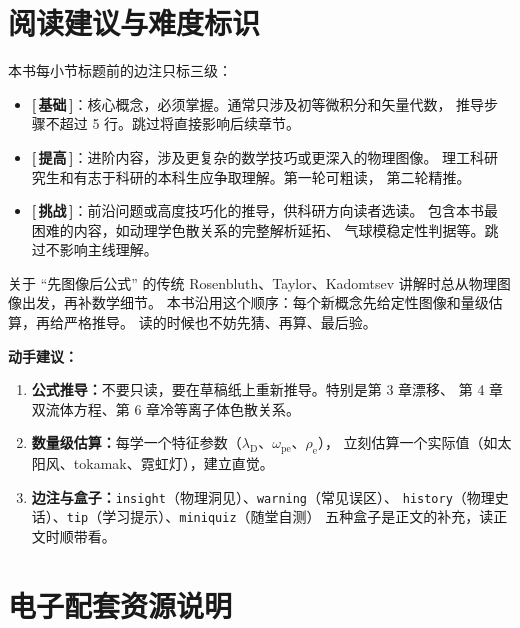 \documentclass[12pt,a4paper,openany,oneside]{book}
\newcommand{\ee}{\mathrm{e}}
\begin{document}
\section*{阅读建议与难度标识}
{}

本书每小节标题前的边注只标三级：

\begin{itemize}
\item \textbf{[\,基础\,]}：核心概念，必须掌握。通常只涉及初等微积分和矢量代数，
推导步骤不超过 5 行。跳过将直接影响后续章节。

\item \textbf{[\,提高\,]}：进阶内容，涉及更复杂的数学技巧或更深入的物理图像。
理工科研究生和有志于科研的本科生应争取理解。第一轮可粗读，
第二轮精推。

\item \textbf{[\,挑战\,]}：前沿问题或高度技巧化的推导，供科研方向读者选读。
包含本书最困难的内容，如动理学色散关系的完整解析延拓、
气球模稳定性判据等。跳过不影响主线理解。
\end{itemize}

\begin{history}{关于 ``先图像后公式'' 的传统}{}{}
Rosenbluth、Taylor、Kadomtsev 讲解时总从物理图像出发，再补数学细节。
本书沿用这个顺序：每个新概念先给定性图像和量级估算，再给严格推导。
读的时候也不妨先猜、再算、最后验。
\end{history}

\textbf{动手建议：}
\begin{enumerate}
\item \textbf{公式推导：}不要只读，要在草稿纸上重新推导。特别是第 3 章漂移、
第 4 章双流体方程、第 6 章冷等离子体色散关系。
\item \textbf{数量级估算：}每学一个特征参数（$\lambda_\mathrm{D}$、$\omega_{\mathrm{p}\ee}$、$\rho_\ee$），
立刻估算一个实际值（如太阳风、tokamak、霓虹灯），建立直觉。
\item \textbf{边注与盒子：}\texttt{insight}（物理洞见）、\texttt{warning}（常见误区）、
\texttt{history}（物理史话）、\texttt{tip}（学习提示）、\texttt{miniquiz}（随堂自测）
五种盒子是正文的补充，读正文时顺带看。
\end{enumerate}


\section*{电子配套资源说明}
{}
\end{document}
